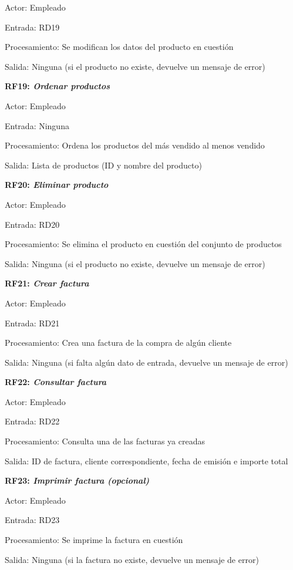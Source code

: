\documentclass[paper=a4, fontsize=11pt, spanish]{scrartcl}
\begin{document}
	Actor: Empleado

	Entrada: RD19

	Procesamiento: Se modifican los datos del producto en cuestión

	Salida: Ninguna (si el producto no existe, devuelve un mensaje de error)

	\setlength{\parindent}{0em}
	\textbf{RF19: \textit{Ordenar productos}}
	\setlength{\parindent}{2em}

	Actor: Empleado

	Entrada: Ninguna

	Procesamiento: Ordena los productos del más vendido al menos vendido

	Salida: Lista de productos (ID y nombre del producto)

	\setlength{\parindent}{0em}
	\textbf{RF20: \textit{Eliminar producto}}
	\setlength{\parindent}{2em}

	Actor: Empleado

	Entrada: RD20

	Procesamiento: Se elimina el producto en cuestión del conjunto de productos

	Salida: Ninguna (si el producto no existe, devuelve un mensaje de error)

	\setlength{\parindent}{0em}
	\textbf{RF21: \textit{Crear factura}}
	\setlength{\parindent}{2em}

	Actor: Empleado

	Entrada: RD21

	Procesamiento: Crea una factura de la compra de algún cliente

	Salida: Ninguna (si falta algún dato de entrada, devuelve un mensaje de error)

	\setlength{\parindent}{0em}
	\textbf{RF22: \textit{Consultar factura}}
	\setlength{\parindent}{2em}

	Actor: Empleado

	Entrada: RD22

	Procesamiento: Consulta una de las facturas ya creadas

	Salida: ID de factura, cliente correspondiente, fecha de emisión e importe total

	\setlength{\parindent}{0em}
	\textbf{RF23: \textit{Imprimir factura (opcional)}}
	\setlength{\parindent}{2em}

	Actor: Empleado

	Entrada: RD23

	Procesamiento: Se imprime la factura en cuestión

	Salida: Ninguna (si la factura no existe, devuelve un mensaje de error)
\end{document}
